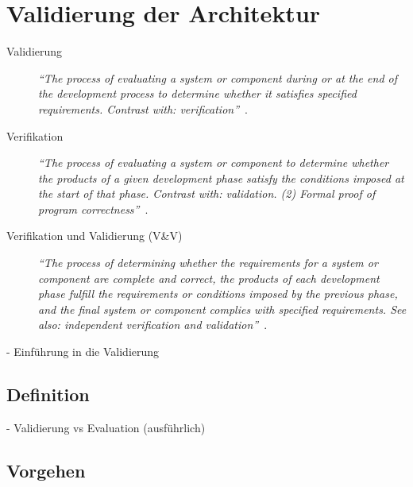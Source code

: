 
\chapter{Validierung der Architektur} %
\label{cha:validierung_der_architektur}

  \begin{description}
    \item[Validierung] \emph{"`The process of evaluating a system or component during or at the end of the development process to determine whether it satisfies specified requirements. Contrast with: verification"'}~\citep{ieee90sg}.
  \end{description}
  
  \begin{description}
    \item[Verifikation] \emph{"`The process of evaluating a system or component to determine whether the products of a given development phase satisfy the conditions imposed at the start of that phase. Contrast with: validation. (2) Formal proof of program correctness"'}~\citep{ieee90sg}.
  \end{description}
  
  \begin{description}
    \item[Verifikation und Validierung (V\&V)] \emph{"`The process of determining whether the requirements for a system or component are complete and correct, the products of each development phase fulfill the requirements or conditions imposed by the previous phase, and the final system or component complies with specified requirements. See also: independent verification and validation"'}~\citep{ieee90sg}.
  \end{description}

  - Einführung in die Validierung~\citep{balzert1998lst}
  
\section{Definition} %
\label{sec:definition}

  - Validierung vs Evaluation (ausführlich)


\section{Vorgehen} %
\label{sec:vorgehen}

